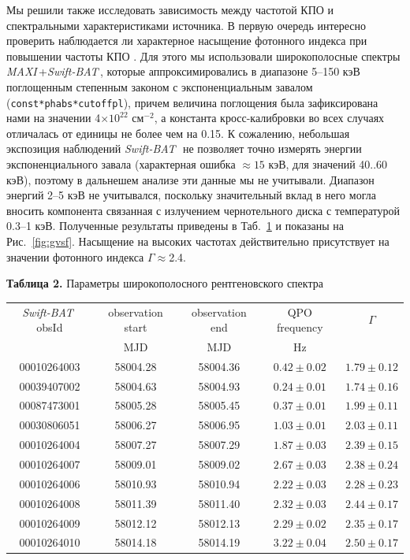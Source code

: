 \documentclass{pazhb}
\def\maxi{{\em MAXI}}
\def\swiftb{{\em Swift-BAT\,}}
\begin{document}
Мы решили также исследовать зависимость между частотой КПО и спектральными характеристиками источника. В первую очередь интересно проверить наблюдается ли характерное насыщение фотонного индекса при повышении частоты КПО \citep[см. например ][]{sobczak00,vignarca03}. Для этого мы использовали широкополосные спектры \maxi\,+\swiftb, которые аппроксимировались в диапазоне 5--150 кэВ поглощенным степенным законом с экспоненциальным завалом (\texttt{const*phabs*cutoffpl}), причем величина поглощения была зафиксирована нами на значении 4$\times10^{22}$ см$^{-2}$, а константа кросс-калибровки во всех случаях отличалась от единицы не более чем на 0.15. К сожалению, небольшая экспозиция наблюдений \swiftb\, не позволяет точно измерять энергии экспоненциального завала (характерная ошибка $\approx15$ кэВ, для значений 40..60 кэВ), поэтому в дальнешем анализе эти данные мы не учитывали. Диапазон энергий 2--5 кэВ не учитывался, поскольку значительный вклад в него могла вносить компонента связанная с излучением чернотельного диска с температурой 0.3--1 кэВ.
 Полученные результаты приведены в Таб.~\ref{tab:gvsf} и показаны на Рис.~\ref{fig:gvsf}. Насыщение на высоких частотах действительно присутствует на значении фотонного индекса  $\Gamma\approx$2.4.

\begin{table}[t]

\vspace{6mm}
\centering
{{\bf Таблица 2.} Параметры широкополосного рентгеновского спектра\protect\\}

\vspace{5mm}\begin{tabular}{c|c|c|c|c} \hline\hline
\swiftb\,obsId & observation start & observation end &  QPO frequency &$\Gamma$\\
                        &        MJD              & MJD                    & Hz                      &\\ 
\hline
00010264003 &58004.28&58004.36  &$0.42\pm 0.02 $ & $1.79\pm0.12$\\
00039407002 &58004.63&58004.93  &$0.24\pm 0.01 $ & $1.74\pm0.16$\\
00087473001 &58005.28&58005.45  &$0.37\pm 0.01 $ & $1.99\pm0.11$\\
00030806051 &58006.27&58006.95&$1.03\pm 0.01 $ & $2.03\pm0.11$\\ 
00010264004 &58007.27&58007.29&  $1.87\pm 0.03 $ & $2.39\pm 0.15 $\\
00010264007 &58009.01&58009.02&  $2.67\pm 0.03 $ & $2.38\pm 0.24 $\\
00010264006 &58010.93&58010.94&  $2.22\pm 0.03 $  & $2.28\pm 0.23 $\\
00010264008 &58011.39&58011.40&  $2.32\pm 0.03 $ & $2.44\pm 0.17 $\\
00010264009 &58012.12&58012.13&  $2.29\pm 0.02 $& $2.35\pm 0.17 $\\
00010264010 &58014.18&58014.19&  $3.22\pm 0.04 $ & $2.50\pm 0.17 $\\
\hline
\end{tabular}
\label{tab:gvsf}
\end{table}
\end{document}
